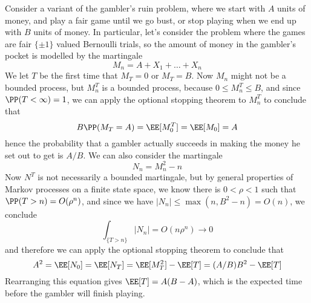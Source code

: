 \begin{example}
    Consider a variant of the gambler's ruin problem, where we start with $A$ units of money, and play a fair game until we go bust, or stop playing when we end up with $B$ units of money. In particular, let's consider the problem where the games are fair $\{ \pm 1 \}$ valued Bernoulli trials, so the amount of money in the gambler's pocket is modelled by the martingale
    \[ M_n = A + X_1 + \dots + X_n \]
    We let $T$ be the first time that $M_T = 0$ or $M_T = B$. Now $M_n$ might not be a bounded process, but $M_n^T$ is a bounded process, because $0 \leq M_n^T \leq B$, and since $\PP(T < \infty) = 1$, we can apply the optional stopping theorem to $M_n^T$ to conclude that
    \[ B \PP(M_T = A) = \EE[M^T_0] = \EE[M_0] = A \]
    hence the probability that a gambler actually succeeds in making the money he set out to get is $A/B$. We can also consider the martingale
    \[ N_n = M_n^2 - n \]
    Now $N^T$ is not necessarily a bounded martingale, but by general properties of Markov processes on a finite state space, we know there is $0 < \rho < 1$ such that $\PP(T > n) = O(\rho^n)$, and since we have $|N_n| \leq \max(n,B^2 - n) = O(n)$, we conclude
    \[ \int_{\{ T > n \}} |N_n| = O(n \rho^n) \to 0 \]
    and therefore we can apply the optional stopping theorem to conclude that
    \[ A^2 = \EE[N_0] = \EE[N_T] = \EE[M_T^2] - \EE[T] = (A/B) B^2 - \EE[T] \]
    Rearranging this equation gives $\EE[T] = A(B - A)$, which is the expected time before the gambler will finish playing.
\end{example}


